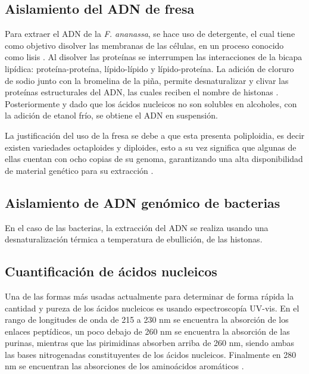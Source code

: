 \documentclass[fleqn,10pt]{SelfArx}
\begin{document}
	\subsection{Aislamiento del ADN de fresa}
		Para extraer el ADN de la \textit{F. ananassa}, se hace uso de detergente, el cual tiene como objetivo disolver las membranas de las células, en un proceso conocido como lisis \cite{virgili2006genoma, puerta2005practicas}. Al disolver las proteínas se interrumpen las interacciones de la bicapa lipídica: proteína-proteína, lípido-lípido y lípido-proteína. La adición de cloruro de sodio junto con la bromelina de la piña, permite desnaturalizar y clivar las proteínas estructurales del ADN, las cuales reciben el nombre de histonas \cite{poh2011thermal}. Posteriormente y dado que los ácidos nucleicos no son solubles en alcoholes, con la adición de etanol frío, se obtiene el ADN en suspensión.
		
		La justificación del uso de la fresa se debe a que esta presenta poliploidia, es decir existen variedades octaploides y diploides, esto a su vez significa que algunas de ellas cuentan con ocho copias de su genoma, garantizando una alta disponibilidad de material genético para su extracción \cite{husaini2016strawberry}.
	
	\subsection{Aislamiento de ADN genómico de bacterias}
		En el caso de las bacterias, la extracción del ADN se realiza usando una desnaturalización térmica a temperatura de ebullición, de las histonas.
	
	\subsection{Cuantificaci\'on de \'acidos nucleicos}
		Una de las formas más usadas actualmente para determinar de forma rápida la cantidad y pureza de los ácidos nucleicos es usando espectroscopía UV-vis. En el rango de longitudes de onda de 215 a 230 nm se encuentra la absorción de los enlaces peptídicos, un poco debajo de 260 nm se encuentra la absorción de las purinas, mientras que las pirimidinas absorben arriba de 260 nm, siendo ambas las bases nitrogenadas constituyentes de los ácidos nucleicos. Finalmente en 280 nm se encuentran las absorciones de los aminoácidos aromáticos \cite{sambrook2001molecular}.
\end{document}
